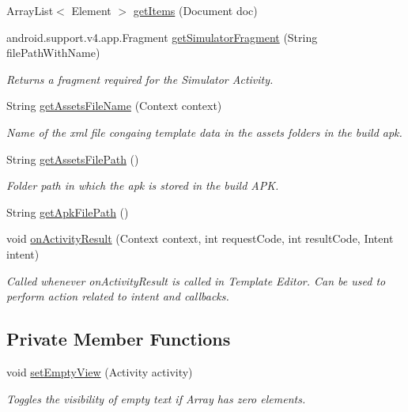 \begin{DoxyCompactItemize}
Array\+List$<$ Element $>$ \hyperlink{classorg_1_1buildmlearn_1_1toolkit_1_1templates_1_1LearnSpellingTemplate_a289b6e6a43daae52a975f3e74c03fa97}{get\+Items} (Document doc)
\item 
android.\+support.\+v4.\+app.\+Fragment \hyperlink{classorg_1_1buildmlearn_1_1toolkit_1_1templates_1_1LearnSpellingTemplate_a74f2099ed791540d7c96ed24af06e9de}{get\+Simulator\+Fragment} (String file\+Path\+With\+Name)
\begin{DoxyCompactList}\small\item\em Returns a fragment required for the Simulator Activity. \end{DoxyCompactList}\item 
String \hyperlink{classorg_1_1buildmlearn_1_1toolkit_1_1templates_1_1LearnSpellingTemplate_a6ff9294df5f9a7b85fedd139f4f3a691}{get\+Assets\+File\+Name} (Context context)
\begin{DoxyCompactList}\small\item\em Name of the xml file congaing template data in the assets folders in the build apk. \end{DoxyCompactList}\item 
String \hyperlink{classorg_1_1buildmlearn_1_1toolkit_1_1templates_1_1LearnSpellingTemplate_a49bf35434b6abe45d04db8ed1f16b9e1}{get\+Assets\+File\+Path} ()
\begin{DoxyCompactList}\small\item\em Folder path in which the apk is stored in the build A\+PK. \end{DoxyCompactList}\item 
String \hyperlink{classorg_1_1buildmlearn_1_1toolkit_1_1templates_1_1LearnSpellingTemplate_a05c6bdea670350a1f2aed2c9c4b28e10}{get\+Apk\+File\+Path} ()
\item 
void \hyperlink{classorg_1_1buildmlearn_1_1toolkit_1_1templates_1_1LearnSpellingTemplate_a3717f8c402a9da264b3d8e6665532c3c}{on\+Activity\+Result} (Context context, int request\+Code, int result\+Code, Intent intent)
\begin{DoxyCompactList}\small\item\em Called whenever on\+Activity\+Result is called in Template Editor. Can be used to perform action related to intent and callbacks. \end{DoxyCompactList}\end{DoxyCompactItemize}
\subsection*{Private Member Functions}
\begin{DoxyCompactItemize}
\item 
void \hyperlink{classorg_1_1buildmlearn_1_1toolkit_1_1templates_1_1LearnSpellingTemplate_a5c090cd62029ccfe1c08f99944486c1c}{set\+Empty\+View} (Activity activity)
\begin{DoxyCompactList}\small\item\em Toggles the visibility of empty text if Array has zero elements. \end{DoxyCompactList}\end{DoxyCompactItemize}
